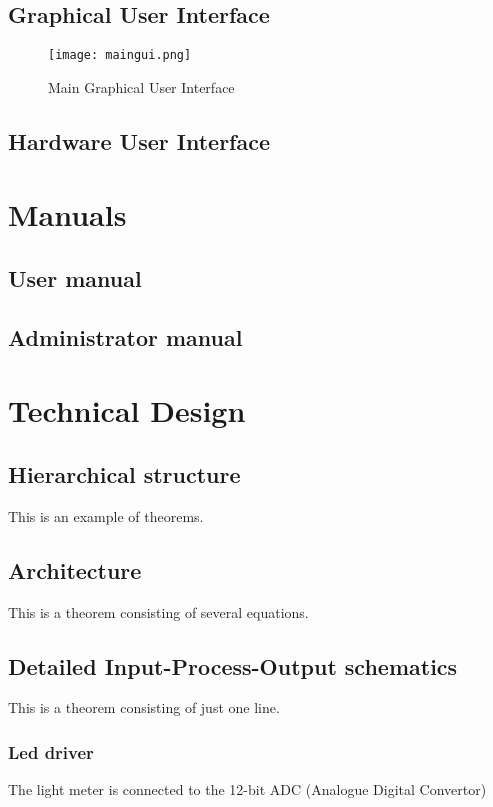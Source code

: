 \documentclass[11pt,fleqn,,a4paper,twoside,openright]{book}
\begin{document}
\section{Graphical User Interface}

\begin{figure}[h]
	\texttt{[image: maingui.png]}
	\caption{Main Graphical User Interface}\label{fig:GUI}
\end{figure}

\section{Hardware User Interface}

\chapter{Manuals}\label{manuals}

\section{User manual}

\section{Administrator manual}

\chapter{Technical Design}

\section{Hierarchical structure} 

This is an example of theorems.

\section{Architecture} 
This is a theorem consisting of several equations.

\section{Detailed Input-Process-Output schematics} 
This is a theorem consisting of just one line.

\subsection{Led driver}
The light meter is connected to the 12-bit ADC (Analogue Digital Convertor)
\end{document}
